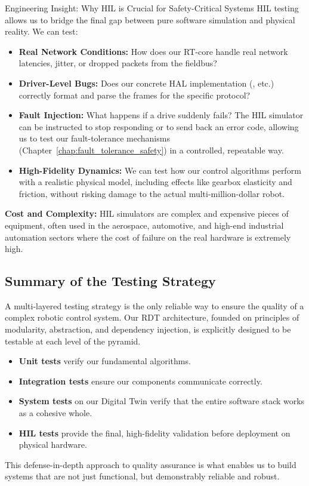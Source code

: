 \begin{tipbox}{Engineering Insight: Why HIL is Crucial for Safety-Critical Systems} %
HIL testing allows us to bridge the final gap between pure software simulation and physical reality. We can test:
\begin{itemize}
    \item \textbf{Real Network Conditions:} How does our RT-core handle real network latencies, jitter, or dropped packets from the fieldbus?
    \item \textbf{Driver-Level Bugs:} Does our concrete HAL implementation (, etc.) correctly format and parse the frames for the specific protocol?
    \item \textbf{Fault Injection:} What happens if a drive suddenly fails? The HIL simulator can be instructed to stop responding or to send back an error code, allowing us to test our fault-tolerance mechanisms (Chapter~\ref{chap:fault_tolerance_safety}) in a controlled, repeatable way.
    \item \textbf{High-Fidelity Dynamics:} We can test how our control algorithms perform with a realistic physical model, including effects like gearbox elasticity and friction, without risking damage to the actual multi-million-dollar robot.
\end{itemize}
\end{tipbox}
\textbf{Cost and Complexity:} HIL simulators are complex and expensive pieces of equipment, often used in the aerospace, automotive, and high-end industrial automation sectors where the cost of failure on the real hardware is extremely high.


\subsection{Summary of the Testing Strategy}
\label{subsec:testing_strategy_summary}

A multi-layered testing strategy is the only reliable way to ensure the quality of a complex robotic control system. Our RDT architecture, founded on principles of modularity, abstraction, and dependency injection, is explicitly designed to be testable at each level of the pyramid.
\begin{itemize}
    \item \textbf{Unit tests} verify our fundamental algorithms.
    \item \textbf{Integration tests} ensure our components communicate correctly.
    \item \textbf{System tests} on our Digital Twin verify that the entire software stack works as a cohesive whole.
    \item \textbf{HIL tests} provide the final, high-fidelity validation before deployment on physical hardware.
\end{itemize}
This defense-in-depth approach to quality assurance is what enables us to build systems that are not just functional, but demonstrably reliable and robust.


